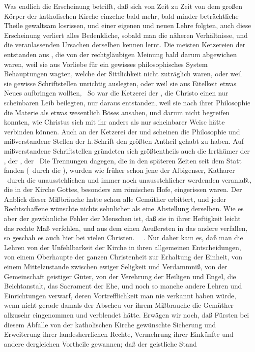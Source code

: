 \begin{aufza}
\item Was endlich die Erscheinung betrifft, daß sich von Zeit zu Zeit von dem großen Körper der katholischen Kirche einzelne bald mehr, bald minder beträchtliche Theile gewaltsam losrissen, und einer eigenen und neuen Lehre folgten, auch diese Erscheinung verliert alles Bedenkliche, sobald man die näheren Verhältnisse, und die veranlassenden Ursachen derselben kennen lernt. Die meisten Ketzereien der  entstanden aus , die von der rechtgläubigen Meinung bald darum abgewichen waren, weil sie aus Vorliebe für ein gewisses philosophisches System Behauptungen wagten, welche der Sittlichkeit nicht zuträglich waren, oder weil sie gewisse Schriftstellen unrichtig auslegten, oder weil sie aus Eitelkeit etwas Neues aufbringen wollten, \udgl\  So war die Ketzerei der , die Christo einen nur scheinbaren Leib beilegten, nur daraus entstanden, weil sie nach ihrer Philosophie die Materie als etwas wesentlich Böses ansahen, und darum nicht begreifen konnten, wie Christus sich mit ihr anders als nur scheinbarer Weise hätte verbinden können. Auch an der Ketzerei der  und  scheinen die Philosophie und mißverstandene Stellen der h.\,Schrift den größten Antheil gehabt zu haben. Auf mißverstandene Schriftstellen gründeten sich größtentheils auch die Irrthümer der , der , der  \umA\ Die Trennungen dagegen, die in den späteren Zeiten seit dem  Statt fanden (\zB\ durch die  \uA ), wurden wie früher schon jene der Albigenser, Katharer \udgl\  durch die unausstehlichen und immer noch unausstehlicher werdenden  veranlaßt, die in der Kirche Gottes, besonders am römischen Hofe, eingerissen waren. Der Anblick dieser Mißbräuche hatte schon alle Gemüther erbittert, und jeder Rechtschaffene wünschte nichts sehnlicher als eine Abstellung derselben. Wie es aber der gewöhnliche Fehler der Menschen ist, daß sie in ihrer Heftigkeit leicht das rechte Maß verfehlen, und aus dem einen Aeußersten in das andere verfallen, so geschah es auch hier bei vielen Christen. ~\ . Nur daher kam es, daß man die Lehren von der Unfehlbarkeit der Kirche in ihren allgemeinen Entscheidungen, von einem Oberhaupte der ganzen Christenheit zur Erhaltung der Einheit, von einem Mittelzustande zwischen ewiger Seligkeit und Verdammniß, von der Gemeinschaft geistiger Güter, von der Verehrung der Heiligen und Engel, die Beichtanstalt, das Sacrament der Ehe, und noch so manche andere Lehren und Einrichtungen verwarf, deren Vortrefflichkeit man nie verkannt haben würde, wenn nicht gerade damals der Abscheu vor ihrem Mißbrauche die Gemüther allzusehr eingenommen und verblendet hätte. Erwägen wir noch, daß Fürsten bei diesem Abfalle von der katholischen Kirche gewünschte Sicherung und Erweiterung ihrer landesherrlichen Rechte, Vermehrung ihrer Einkünfte und andere dergleichen Vortheile gewannen; daß der geistliche Stand 
\end{aufza}
